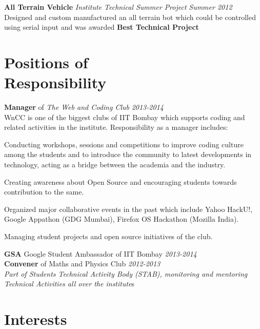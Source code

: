 \documentclass[margin,11pt]{resume}
\begin{document}
\begin{resume}
\textbf{All Terrain Vehicle} \hfill
\textsl{Institute Technical Summer Project} \hfill \emph{Summer 2012} \\ 
Designed and custom manufactured an all terrain bot which could be controlled using serial input and was awarded \textbf{Best Technical Project}



\section{\mysidestyle Positions of\\Responsibility } 


\textbf{Manager} of \emph{The Web and Coding Club} \hfill \emph{2013-2014}\\
WnCC is one of the biggest clubs of IIT Bombay which supports coding and related activities in the institute. Responsibility as a manager includes:
\begin{list2}
\item Conducting workshops, sessions and competitions to improve coding culture among the students and to introduce the community to latest developments in technology, acting as a bridge between the academia and the industry. 
\item Creating awareness about Open Source and encouraging students towards contribution to the same. 
\item Organized major collaborative events in the past which include Yahoo HackU!, Google Appathon (GDG Mumbai), Firefox OS Hackathon (Mozilla India). 
\item Managing student projects and open source initiatives of the club. 
\end{list2}
\textbf{GSA} Google Student Ambassador of IIT Bombay \hfill \emph{2013-2014} \\
\textbf{Convener} of Maths and Physics Club \hfill \emph{2012-2013} \\
\emph{Part of Students Technical Activity Body (STAB), monitoring and mentoring Technical Activities all over the institute}s

\section{\mysidestyle Interests}


\end{resume}
\end{document}
